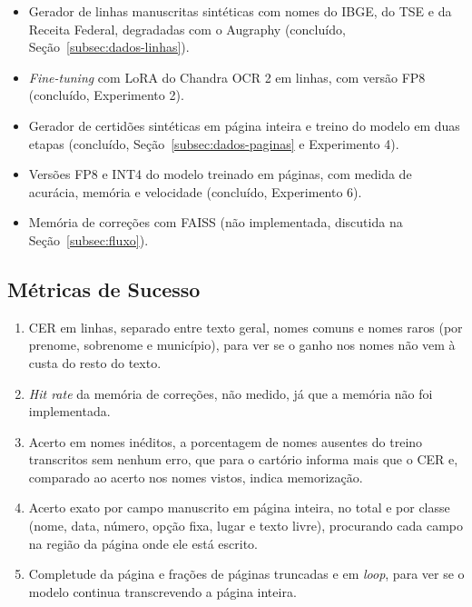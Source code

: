 \begin{itemize}
    \item Gerador de linhas manuscritas sintéticas com nomes do IBGE, do TSE e da Receita Federal, degradadas com o Augraphy (concluído, Seção~\ref{subsec:dados-linhas}).
    \item \emph{Fine-tuning} com LoRA do Chandra OCR 2 em linhas, com versão FP8 (concluído, Experimento 2).
    \item Gerador de certidões sintéticas em página inteira e treino do modelo em duas etapas (concluído, Seção~\ref{subsec:dados-paginas} e Experimento 4).
    \item Versões FP8 e INT4 do modelo treinado em páginas, com medida de acurácia, memória e velocidade (concluído, Experimento 6).
    \item Memória de correções com FAISS (não implementada, discutida na Seção~\ref{subsec:fluxo}).
\end{itemize}

\subsection{Métricas de Sucesso}

\begin{enumerate}
    \item CER em linhas, separado entre texto geral, nomes comuns e nomes raros (por prenome, sobrenome e município), para ver se o ganho nos nomes não vem à custa do resto do texto.
    \item \emph{Hit rate} da memória de correções, não medido, já que a memória não foi implementada.
    \item Acerto em nomes inéditos, a porcentagem de nomes ausentes do treino transcritos sem nenhum erro, que para o cartório informa mais que o CER e, comparado ao acerto nos nomes vistos, indica memorização.
    \item Acerto exato por campo manuscrito em página inteira, no total e por classe (nome, data, número, opção fixa, lugar e texto livre), procurando cada campo na região da página onde ele está escrito.
    \item Completude da página e frações de páginas truncadas e em \emph{loop}, para ver se o modelo continua transcrevendo a página inteira.
\end{enumerate}

